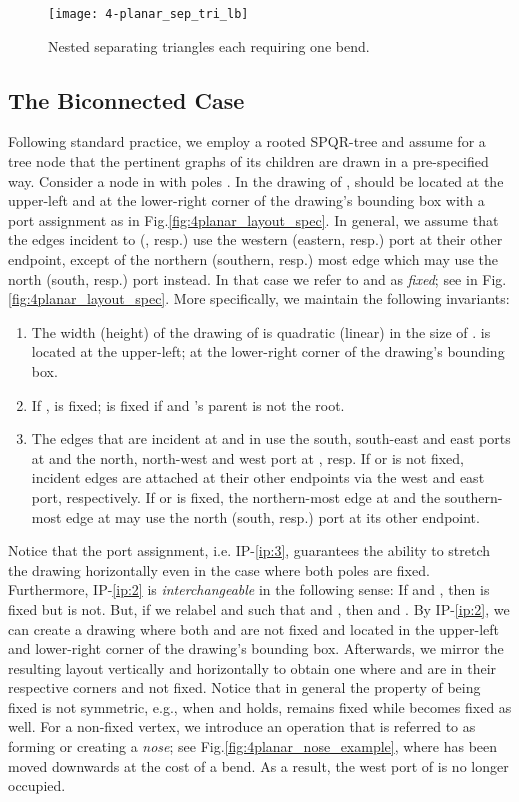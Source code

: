 \documentclass[a4paper,twoside,11pt]{article}
\newcommand{\IPFix}{IP-\ref{ip:2}\xspace}
\newcommand{\IPPort}{IP-\ref{ip:3}\xspace}
\begin{document}
\begin{figure}[t]
    \centering
    \texttt{[image: 4-planar\_sep\_tri\_lb]}
    \caption{Nested separating triangles each requiring one bend.}
    \label{fig:4p_lowerbound}
\end{figure}

\subsection{The Biconnected Case}
\label{sec:4bicon}


Following standard practice, we employ a rooted SPQR-tree and assume
for a tree node that the pertinent graphs of its children are drawn
in a pre-specified way. Consider a node  in  with
poles . In the drawing of
,  should be located at the upper-left and  at the
lower-right corner of the drawing's bounding box with a port
assignment as in Fig.\ref{fig:4planar_layout_spec}. In general, we
assume that the edges incident to  (, resp.) use the western
(eastern, resp.) port at their other endpoint, except of the
northern (southern, resp.) most edge which may use the north (south,
resp.) port instead. In that case we refer to  and  as
\emph{fixed}; see  in
Fig.\ref{fig:4planar_layout_spec}. More specifically, we maintain
the following invariants:

\begin{enumerate}[{I}P-1:]
\item \label{ip:1} The width (height) of the drawing of  is
quadratic (linear) in the size of .  is located at
the upper-left;  at the lower-right corner of the drawing's
bounding box.
\item \label{ip:2} If ,  is fixed;
 is fixed if  and 's parent is not the
root.
\item \label{ip:3} The edges that are incident at  and  in
 use the south, south-east and east ports at  and the
north, north-west and west port at , resp. If  or  is not
fixed, incident edges are attached at their other endpoints via the
west and east port, respectively. If  or  is fixed, the
northern-most edge at  and the southern-most edge at  may use
the north (south, resp.) port at its other endpoint.
\end{enumerate}

Notice that the port assignment, i.e. \IPPort, guarantees the
ability to stretch the drawing horizontally even in the case where
both poles are fixed. Furthermore, \IPFix is \emph{interchangeable}
in the following sense: If  and , then  is fixed but  is not. But, if we relabel  and 
such that  and , then  and
. By \IPFix, we can create a drawing where both
 and  are not fixed and located in the upper-left and
lower-right corner of the drawing's bounding box. Afterwards, we
mirror the resulting layout vertically and horizontally to obtain
one where  and  are in their respective corners and not fixed.
Notice that in general the property of being fixed is not symmetric,
e.g., when  and  holds, 
remains fixed while  becomes fixed as well. For a non-fixed
vertex, we introduce an operation that is referred to as forming or
creating a \emph{nose}; see Fig.\ref{fig:4planar_nose_example},
where  has been moved downwards at the cost of a bend. As a
result, the west port of  is no longer occupied.
\end{document}
